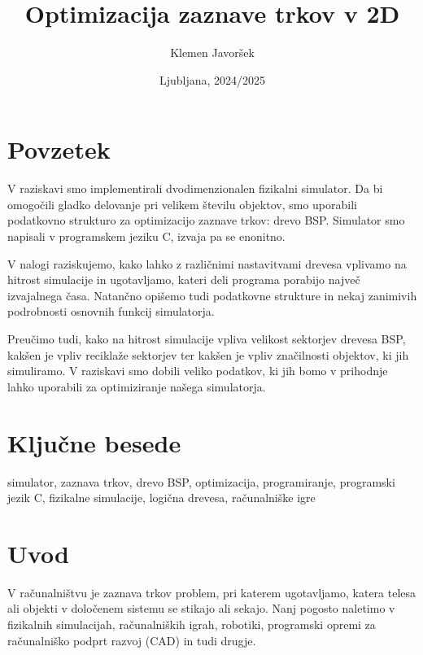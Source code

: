 \documentclass[a4paper,12pt]{article}
\begin{document}
\begin{titlepage}
    \title{\Huge Optimizacija zaznave trkov v 2D}
    \author{Klemen Javoršek}
    \date{Ljubljana, 2024/2025}
    \maketitle
    \renewcommand{\headrulewidth}{0cm}
    \fancyhf{}
    \thispagestyle{fancy}
\end{titlepage}

\newpage
\quad
\thispagestyle{empty}
\newpage
\tableofcontents
\newpage
\section*{Povzetek}
V raziskavi smo implementirali dvodimenzionalen fizikalni simulator. 
Da bi omogočili gladko delovanje pri velikem številu objektov, smo uporabili podatkovno strukturo
za optimizacijo zaznave trkov: drevo BSP. Simulator smo napisali v programskem jeziku C, izvaja pa se enonitno.

V nalogi raziskujemo, kako lahko z različnimi nastavitvami drevesa vplivamo na hitrost simulacije
in ugotavljamo, kateri deli programa porabijo največ izvajalnega časa. Natančno opišemo tudi podatkovne
strukture in nekaj zanimivih podrobnosti osnovnih funkcij simulatorja.

Preučimo tudi, kako na hitrost simulacije vpliva velikost sektorjev drevesa BSP, kakšen je vpliv
reciklaže sektorjev ter kakšen je vpliv značilnosti objektov, ki jih simuliramo. V raziskavi smo
dobili veliko podatkov, ki jih bomo v prihodnje lahko uporabili za optimiziranje našega simulatorja.
\section*{Ključne besede}
simulator, zaznava trkov, drevo BSP, optimizacija, programiranje, programski jezik C, fizikalne simulacije,
logična drevesa, računalniške igre
\newpage
\section{Uvod}

V računalništvu je zaznava trkov problem, pri katerem ugotavljamo, katera telesa ali objekti
v določenem sistemu se stikajo ali sekajo. Nanj pogosto naletimo v fizikalnih simulacijah,
računalniških igrah, robotiki, programski opremi za računalniško podprt razvoj (CAD) in tudi drugje.
\end{document}
